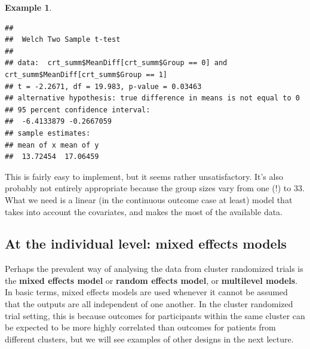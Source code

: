 \documentclass[
  openany]{book}
\newenvironment{Shaded}{\begin{snugshade}}{\end{snugshade}}
\newcommand{\AttributeTok}[1]{\textcolor[rgb]{0.13,0.29,0.53}{#1}}
\newcommand{\DecValTok}[1]{\textcolor[rgb]{0.00,0.00,0.81}{#1}}
\newcommand{\FunctionTok}[1]{\textcolor[rgb]{0.13,0.29,0.53}{\textbf{#1}}}
\newcommand{\NormalTok}[1]{#1}
\newcommand{\SpecialCharTok}[1]{\textcolor[rgb]{0.81,0.36,0.00}{\textbf{#1}}}
\newcommand{\StringTok}[1]{\textcolor[rgb]{0.31,0.60,0.02}{#1}}
\theoremstyle{definition}
\theoremstyle{definition}
\newtheorem{example}{Example}[chapter]
\theoremstyle{definition}
\theoremstyle{definition}
\theoremstyle{remark}
\begin{document}
\begin{example}
\begin{Shaded}
\end{Shaded}

\begin{verbatim}
## 
##  Welch Two Sample t-test
## 
## data:  crt_summ$MeanDiff[crt_summ$Group == 0] and crt_summ$MeanDiff[crt_summ$Group == 1]
## t = -2.2671, df = 19.983, p-value = 0.03463
## alternative hypothesis: true difference in means is not equal to 0
## 95 percent confidence interval:
##  -6.4133879 -0.2667059
## sample estimates:
## mean of x mean of y 
##  13.72454  17.06459
\end{verbatim}

\end{example}

This is fairly easy to implement, but it seems rather unsatisfactory. It's also probably not entirely appropriate because the group sizes vary from one (!) to 33. What we need is a linear (in the continuous outcome case at least) model that takes into account the covariates, and makes the most of the available data.

\hypertarget{at-the-individual-level-mixed-effects-models}{%
\subsection{At the individual level: mixed effects models}\label{at-the-individual-level-mixed-effects-models}}

Perhaps the prevalent way of analysing the data from cluster randomized trials is the \textbf{mixed effects model} or \textbf{random effects model}, or \textbf{multilevel models}. In basic terms, mixed effects models are used whenever it cannot be assumed that the outputs are all independent of one another. In the cluster randomized trial setting, this is because outcomes for participants within the same cluster can be expected to be more highly correlated than outcomes for patients from different clusters, but we will see examples of other designs in the next lecture.
\end{document}
